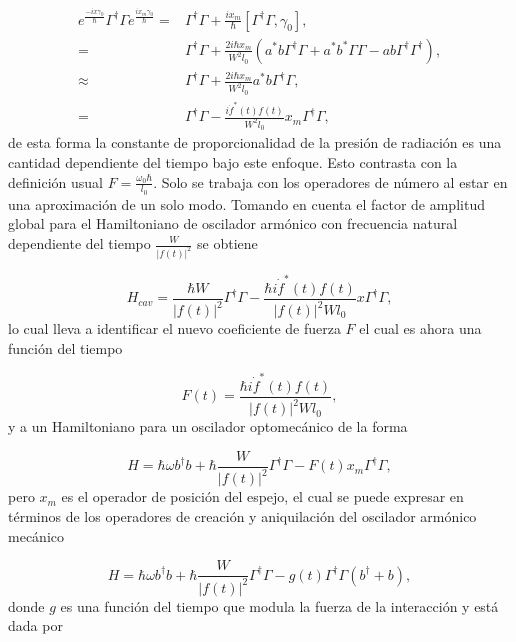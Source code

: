 \documentclass[10pt,a4paper]{report}
\begin{document}
\begin{align*}
e^{\frac{-ix\gamma_0}{\hbar}}\Gamma^\dagger \Gamma e^{\frac{ix_m\gamma_0}{\hbar}} =& \Gamma^\dagger \Gamma + \frac{ix_m}{\hbar}[\Gamma^\dagger \Gamma, \gamma_0], \\
=& \Gamma^\dagger \Gamma + \frac{2i\hbar x_m}{W^2 l_0}(a^*b \Gamma^\dagger \Gamma + a^*b^* \Gamma \Gamma -ab\Gamma^\dagger \Gamma^\dagger),\\
\approx & \Gamma^\dagger \Gamma + \frac{2i\hbar x_m}{W^2 l_0} a^*b \Gamma^\dagger \Gamma, \\
=& \Gamma^\dagger \Gamma - \frac{i \dot{f}^*(t)f(t) }{W^2 l_0} x_m  \Gamma^\dagger \Gamma,
\end{align*} de esta forma la constante de proporcionalidad de la presión de radiación es una cantidad dependiente del tiempo bajo este enfoque. Esto contrasta con la definición usual $F= \frac{\omega_0 \hbar}{l_0}$. Solo se trabaja con los operadores de número al estar en una aproximación de un solo modo. Tomando en cuenta el factor de amplitud global para el Hamiltoniano de oscilador armónico con frecuencia natural dependiente del tiempo $\frac{W}{|f(t)|^2}$ se obtiene

\begin{equation}
H_{cav} = \frac{\hbar W}{|f(t)|^2}\Gamma^\dagger \Gamma - \frac{\hbar i\dot{f}^*(t)f(t) }{|f(t)|^2W l_0}x  \Gamma^ \dagger \Gamma,
\end{equation} lo cual lleva a identificar el nuevo coeficiente de fuerza $F$ el cual es ahora una función del tiempo

\begin{equation}
F(t) = \frac{\hbar i\dot{f}^*(t)f(t) }{|f(t)|^2W l_0},
\end{equation} y a un Hamiltoniano para un oscilador optomecánico de la forma

\begin{equation}
H = \hbar \omega b^\dagger b + \hbar\frac{ W}{|f(t)|^2}\Gamma^\dagger \Gamma -F(t)x_m\Gamma^\dagger \Gamma,
\end{equation} pero $x_m$ es el operador de posición del espejo, el cual se puede expresar en términos de los operadores de creación y aniquilación del oscilador armónico mecánico

\begin{equation}
H = \hbar \omega b^\dagger b + \hbar\frac{ W}{|f(t)|^2}\Gamma^\dagger \Gamma -g(t)\Gamma^\dagger \Gamma(b^\dagger + b),
\end{equation} donde $g$ es una función del tiempo que modula la fuerza de la interacción y está dada por
\end{document}
